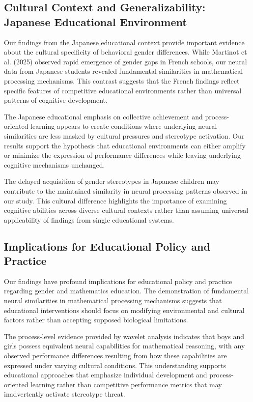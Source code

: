 \documentclass[pdflatex,sn-nature]{sn-jnl}%
\theoremstyle{thmstyleone}%
\theoremstyle{thmstyletwo}%
\theoremstyle{thmstylethree}%
\begin{document}
\subsection{Cultural Context and Generalizability: Japanese Educational Environment}
Our findings from the Japanese educational context provide important evidence about the cultural specificity of behavioral gender differences. While Martinot et al. (2025)\cite{martinot2025mathematical} observed rapid emergence of gender gaps in French schools, our neural data from Japanese students revealed fundamental similarities in mathematical processing mechanisms. This contrast suggests that the French findings reflect specific features of competitive educational environments rather than universal patterns of cognitive development.

The Japanese educational emphasis on collective achievement and process-oriented learning appears to create conditions where underlying neural similarities are less masked by cultural pressures and stereotype activation. Our results support the hypothesis that educational environments can either amplify or minimize the expression of performance differences while leaving underlying cognitive mechanisms unchanged.

The delayed acquisition of gender stereotypes in Japanese children\cite{tatsuno2022development} may contribute to the maintained similarity in neural processing patterns observed in our study. This cultural difference highlights the importance of examining cognitive abilities across diverse cultural contexts rather than assuming universal applicability of findings from single educational systems.


\subsection{Implications for Educational Policy and Practice}
Our findings have profound implications for educational policy and practice regarding gender and mathematics education. The demonstration of fundamental neural similarities in mathematical processing mechanisms suggests that educational interventions should focus on modifying environmental and cultural factors rather than accepting supposed biological limitations.

The process-level evidence provided by wavelet analysis indicates that boys and girls possess equivalent neural capabilities for mathematical reasoning, with any observed performance differences resulting from how these capabilities are expressed under varying cultural conditions. This understanding supports educational approaches that emphasize individual development and process-oriented learning rather than competitive performance metrics that may inadvertently activate stereotype threat.
\end{document}
